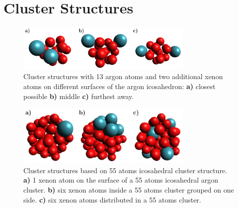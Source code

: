 \section{Cluster Structures}

\begin{figure}[h]
 \centering
 \includegraphics[width=8.5cm]{pics/cluster_2_overview.pdf}
 \caption{Cluster structures with 13 argon atoms and two additional xenon
          atoms on different surfaces of the argon icosahedron:
          \textbf{a)} closest possible \textbf{b)} middle \textbf{c)}
          furthest away.}
 \label{figure:cluster_2_overview}
\end{figure}



\begin{figure}[h]
 \centering
 \includegraphics[width=8.5cm]{pics/cluster_3_overview.pdf}
 \caption{Cluster structures based on 55 atoms icosahedral cluster structure.
          \textbf{a)} 1 xenon atom on the surface of a 55 atoms icosahedral
          argon cluster. \textbf{b)} six xenon atoms inside a 55 atoms cluster
          grouped on one side. \textbf{c)} six xenon atoms distributed
          in a 55 atoms cluster. }
 \label{figure:cluster_3_overview}
\end{figure}
